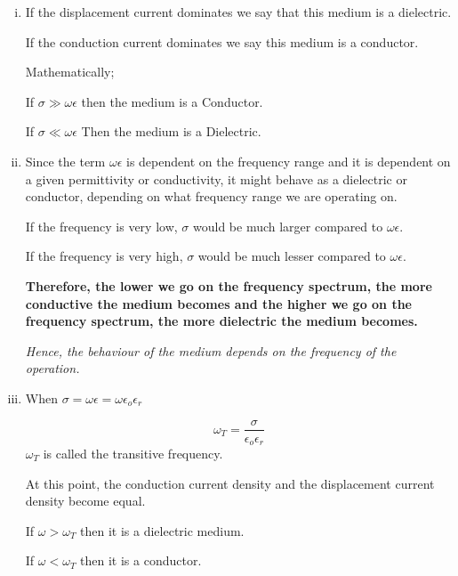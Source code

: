 \begin{enumerate}[(i)]
\item If the displacement current dominates we say that this medium is a dielectric.

If the conduction current dominates we say this medium is a conductor.

Mathematically;

If $\sigma \gg \omega\epsilon$ then the medium is a Conductor.

If $\sigma \ll \omega\epsilon$ Then the medium is a Dielectric.

\item Since the term $\omega\epsilon$ is dependent on the frequency range and it is dependent on a given permittivity or conductivity, it might behave as a dielectric or conductor, depending on what frequency range we are operating on. 

If the frequency is very low, $\sigma$ would be much larger compared to $\omega\epsilon$.

If the frequency is very high, $\sigma$ would be much lesser compared to $\omega\epsilon$.

\textbf{Therefore, the lower we go on the frequency spectrum, the more conductive the medium becomes and the higher we go on the frequency spectrum, the more dielectric the medium becomes.}

\textit{Hence, the behaviour of the medium depends on the frequency of the operation.}

\item When $\sigma = \omega\epsilon = \omega\epsilon_{o}\epsilon_{r}$

\begin{equation} \omega_{T} = \dfrac{\sigma}{\epsilon_{o}\epsilon_{r}}
\end{equation}
$\omega_{T}$ is called the transitive frequency.

At this point, the conduction current density and the displacement current density become equal.

If $\omega > \omega_{T}$ then it is a dielectric medium.

If $\omega < \omega_{T}$ then it is a conductor.
\end{enumerate}


